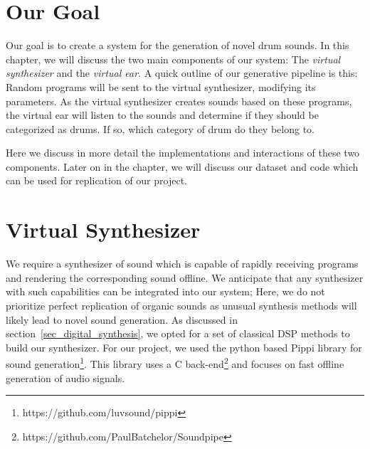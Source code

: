 \documentclass[\main/thesis.tex]{subfiles}
\begin{document}
\label{impl}
\section{Our Goal}
Our goal is to create a system for the generation of novel drum sounds. In this chapter, we will discuss the two main components of our system: The \textit{virtual synthesizer} and the \textit{virtual ear}. A quick outline of our generative pipeline is this: Random programs will be sent to the virtual synthesizer, modifying its parameters. As the virtual synthesizer creates sounds based on these programs, the virtual ear will listen to the sounds and determine if they should be categorized as drums. If so, which category of drum do they belong to. 

Here we discuss in more detail the implementations and interactions of these two components. Later on in the chapter, we will discuss our dataset and code which can be used for replication of our project. 
\section{Virtual Synthesizer}
\label{vs}
We require a synthesizer of sound which is capable of rapidly receiving programs and rendering the corresponding sound offline. We anticipate that any synthesizer with such capabilities can be integrated into our system; Here, we do not prioritize perfect replication of organic sounds as unusual synthesis methods will likely lead to novel sound generation. As discussed in section~\ref{sec_digital_synthesis}, we opted for a set of classical DSP methods to build our synthesizer. For our project, we used the python based Pippi library for sound generation\footnote{https://github.com/luvsound/pippi}. This library uses a C back-end\footnote{https://github.com/PaulBatchelor/Soundpipe} and focuses on fast offline generation of audio signals.
\end{document}
